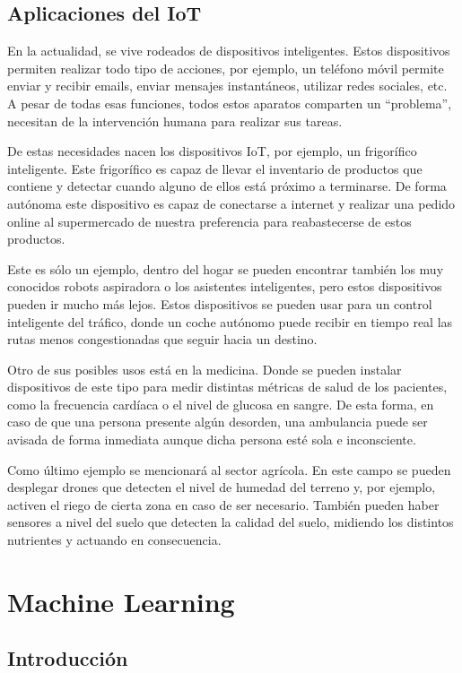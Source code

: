 \subsection{Aplicaciones del IoT}

En la actualidad, se vive rodeados de dispositivos inteligentes. Estos dispositivos  permiten realizar todo tipo de acciones, por ejemplo, un teléfono móvil permite enviar y recibir emails, enviar mensajes instantáneos, utilizar redes sociales, etc. A pesar de todas esas funciones, todos estos aparatos comparten un ``problema'', necesitan de la intervención humana para realizar sus tareas.

De estas necesidades nacen los dispositivos IoT, por ejemplo, un frigorífico inteligente. Este frigorífico es capaz de llevar el inventario de productos que contiene y detectar cuando alguno de ellos está próximo a terminarse. De forma autónoma este dispositivo es capaz de conectarse a internet y realizar una pedido online al supermercado de nuestra preferencia para reabastecerse de estos productos.

Este es sólo un ejemplo, dentro del hogar se pueden encontrar también los muy conocidos robots aspiradora o los asistentes inteligentes, pero estos dispositivos pueden ir mucho más lejos. Estos dispositivos se pueden usar para un control inteligente del tráfico, donde un coche autónomo puede recibir en tiempo real las rutas menos congestionadas que seguir hacia un destino.

Otro de sus posibles usos está en la medicina. Donde se pueden instalar dispositivos de este tipo para medir distintas métricas de salud de los pacientes, como la frecuencia cardíaca o el nivel de glucosa en sangre. De esta forma, en caso de que una persona presente algún desorden, una ambulancia puede ser avisada de forma inmediata aunque dicha persona esté sola e inconsciente.

Como último ejemplo se mencionará al sector agrícola. En este campo se pueden desplegar drones que detecten el nivel de humedad del terreno y, por ejemplo, activen el riego de cierta zona en caso de ser necesario. También pueden haber sensores a nivel del suelo que detecten la calidad del suelo, midiendo los distintos nutrientes y actuando en consecuencia.

\section{Machine Learning}

\subsection{Introducción}

